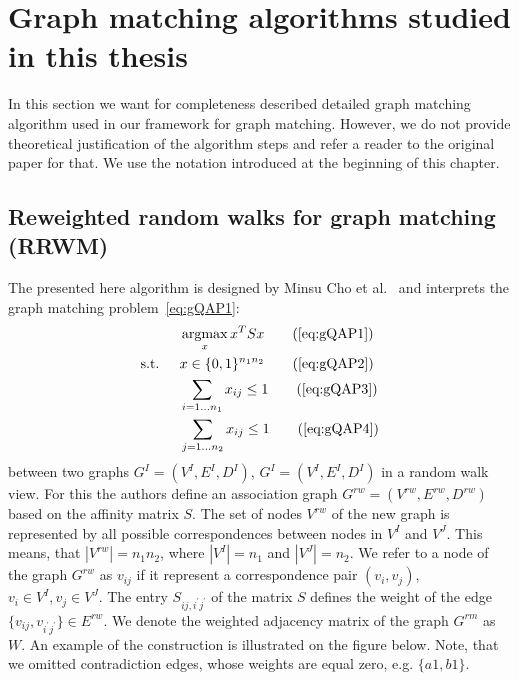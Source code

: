 \section{Graph matching algorithms studied in this thesis}
In this section we want for completeness described detailed graph matching algorithm used in our framework for graph matching. However, we do not provide theoretical justification of the algorithm steps and refer a reader to the original paper for that. We use the notation introduced at the beginning of this chapter.

\subsection{Reweighted random walks for graph matching (RRWM)}
The presented here algorithm is designed by Minsu Cho et al.~\cite{Cho2010_RRWM} and interprets the graph matching problem~\eqref{eq:gQAP1}:
\begin{alignat*}{2}
    &     && \argmax_x{x^TSx}                           \tag{\ref{eq:gQAP1}}\\
    & \text{s.t. } &&  x\in \{0,1\}^{n_1n_2}            \tag{\ref{eq:gQAP2}}\\
    &             &&  \sum_{i=1\dots n_1} x_{ij}\le 1   \tag{\ref{eq:gQAP3}}\\
    &             &&  \sum_{j=1\dots n_2} x_{ij}\le 1   \tag{\ref{eq:gQAP4}}
\end{alignat*}
between two graphs $G^I=(V^I,E^I,D^I)$, $G^I=(V^I,E^I,D^I)$ in a random walk view. For this the authors define an association graph $G^{rw}=(V^{rw},E^{rw},D^{rw})$ based on the affinity matrix $S$. The set of nodes $V^{rw}$ of the new graph is represented by all possible correspondences between nodes in $V^I$ and $V^J$. This means, that $|V^{rw}|=n_1n_2$, where $|V^I|=n_1$ and $|V^J|=n_2$. We refer to a node of the graph $G^{rw}$ as $v_{ij}$ if it represent a correspondence pair $(v_i,v_j)$, $v_i\in V^I,v_j\in V^J$. The entry $S_{ij,i^\prime j^\prime}$ of the matrix $S$ defines the weight of the edge $\{v_{ij},v_{i^\prime j^\prime}\}\in E^{rw}$. We denote the weighted adjacency matrix of the graph $G^{rm}$ as $W$. An example of the construction is illustrated on the figure below. Note, that we omitted contradiction edges, whose weights are equal zero, e.g. $\{a1,b1\}$.

